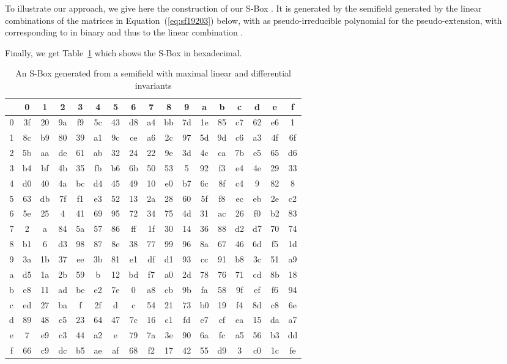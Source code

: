 \documentclass{article}\usepackage{amsthm}
\newcommand{\SBox}{S-Box\xspace}
\begin{document}
To illustrate our approach, we give here the construction of our \SBox
. It is generated by the semifield generated by the linear combinations
of the matrices in Equation~(\ref{eq:sf19203}) below, with  as 
pseudo-irreducible polynomial for the pseudo-extension, with 
corresponding to  in binary and thus to the linear combination .


Finally, we get Table~\ref{tab:23016} which shows the  \SBox in
hexadecimal.

\begin{table}[htb]\center
\begin{tabular}{|c||c|c|c|c|c|c|c|c|c|c|c|c|c|c|c|c|}
  \hline
  & 0 & 1 &2 &3 &4 &5&6&7&8&9&a&b&c&d&e&f \\
  \hline
  \hline
  0&  3f & 20 & 9a & f9 & 5c & 43 & d8 & a4 & bb & 7d & 1e & 85 & c7 & 62 & e6 & 1  \\ \hline
  1&  8c & b9 & 80 & 39 & a1 & 9c & ce & a6 & 2c & 97 & 5d & 9d & c6 & a3 & 4f & 6f \\ \hline
  2&  5b & aa & de & 61 & ab & 32 & 24 & 22 & 9e & 3d & 4c & ca & 7b & e5 & 65 & d6 \\ \hline
  3&  b4 & bf & 4b & 35 & fb & b6 & 6b & 50 & 53 & 5 & 92 & f3 & e4 & 4e & 29 & 33 \\ \hline
  4&  d0 & 40 & 4a & bc & d4 & 45 & 49 & 10 & e0 & b7 & 6c & 8f & c4 & 9 & 82 & 8 \\ \hline
  5&  63 & db & 7f & f1 & e3 & 52 & 13 & 2a & 28 & 60 & 5f & f8 & ec & eb & 2e & c2 \\ \hline
  6&  5e & 25 & 4 & 41 & 69 & 95 & 72 & 34 & 75 & 4d & 31 & ac & 26 & f0 & b2 & 83 \\ \hline
  7&  2 & a & 84 & 5a & 57 & 86 & ff & 1f & 30 & 14 & 36 & 88 & d2 & d7 & 70 & 74 \\ \hline
  8&  b1 & 6 & d3 & 98 & 87 & 8e & 38 & 77 & 99 & 96 & 8a & 67 & 46 & 6d & f5 & 1d \\ \hline
  9&  3a & 1b & 37 & ee & 3b & 81 & e1 & df & d1 & 93 & cc & 91 & b8 & 3c & 51 & a9 \\ \hline
  a&  d5 & 1a & 2b & 59 & b & 12 & bd & f7 & a0 & 2d & 78 & 76 & 71 & cd & 8b & 18 \\ \hline
  b&  e8 & 11 & ad & be & e2 & 7e & 0 & a8 & cb & 9b & fa & 58 & 9f & ef & f6 & 94 \\ \hline
  c&  ed & 27 & ba & f & 2f & d & c & 54 & 21 & 73 & b0 & 19 & f4 & 8d & c8 & 6e \\ \hline
  d&  89 & 48 & c5 & 23 & 64 & 47 & 7c & 16 & c1 & fd & e7 & cf & ea & 15 & da & a7 \\ \hline
  e&  7 & e9 & c3 & 44 & a2 & e & 79 & 7a & 3e & 90 & 6a & fc & a5 & 56 & b3 & dd \\ \hline
  f&  66 & c9 & dc & b5 & ae & af & 68 & f2 & 17 & 42 & 55 & d9 & 3 & c0 & 1c & fe \\ \hline

\end{tabular} 
\caption{An \SBox generated from a semifield with maximal linear and differential invariants}\label{tab:23016}
\end{table}
\end{document}
